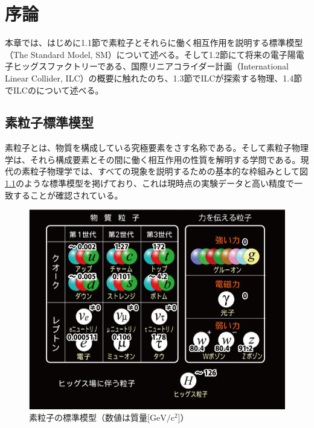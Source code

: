 
\chapter{序論} \label{sec:Intruduction}
本章では、はじめに1.1節で素粒子とそれらに働く相互作用を説明する標準模型（The Standard Model, SM）について述べる。そして1.2節にて将来の電子陽電子ヒッグスファクトリーである、国際リニアコライダー計画（International Linear Collider, ILC）の概要に触れたのち、1.3節でILCが探索する物理、1.4節でILCのについて述べる。
\section{素粒子標準模型}
素粒子とは、物質を構成している究極要素をさす名称である。そして素粒子物理学は、それら構成要素とその間に働く相互作用の性質を解明する学問である。現代の素粒子物理学では、すべての現象を説明するための基本的な枠組みとして図\ref{sm}のような標準模型を掲げており、これは現時点の実験データと高い精度で一致することが確認されている。\\
\begin{figure}[ht]
	\begin{center}
 \includegraphics[keepaspectratio, scale=0.4]
 	{Figure/Introduction/sm.jpg}
 		\caption{素粒子の標準模型（数値は質量[$\mathrm{GeV/c^2}$]）}
 		\label{sm}
	\end{center}
\end{figure}
